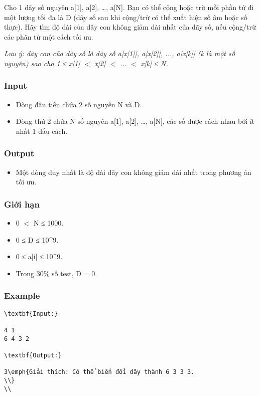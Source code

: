 



   Cho 1 dãy số nguyên a[1], a[2], …, a[N]. Bạn có thể cộng hoặc trừ mỗi phần tử đi một lượng tối đa là D (dãy số sau khi cộng/trừ có thể xuất hiện số âm hoặc số thực). Hãy tìm độ dài của dây con không giảm dài nhất của dãy số, nếu cộng/trừ các phân tử một cách tối ưu.  

\emph{    Lưu ý: dãy con của dãy số là dãy số a[x[1]], a[x[2]], ..., a[x[k]] (k là một số nguyên) sao cho 1 ≤ x[1] $<$ x[2] $<$ ... $<$ x[k] ≤ N.   }

\subsubsection{   Input  }
\begin{itemize}
	\item     Dòng đầu tiên chứa 2 số nguyên N và D.   
	\item     Dòng thứ 2 chứa N số nguyên a[1], a[2], …, a[N], các số được cách nhau bởi ít nhất 1 dấu cách.   
\end{itemize}



\subsubsection{   Output  }
\begin{itemize}
	\item     Một dòng duy nhất là độ dài dãy con không giảm dài nhất trong phương án tối ưu.   
\end{itemize}

\subsubsection{   Giới hạn  }
\begin{itemize}
	\item     0 $<$ N ≤ 1000.   
	\item     0 ≤ D ≤ 10^9.   
	\item     0 ≤ a[i] ≤ 10^9.   
	\item     Trong 30\% số test, D = 0.   
\end{itemize}

\subsubsection{   Example  }
\begin{verbatim}
\textbf{Input:}

4 1
6 4 3 2

\textbf{Output:}

3\emph{Giải thích: Có thể biến đổi dãy thành 6 3 3 3.
\\}
\\\end{verbatim}
